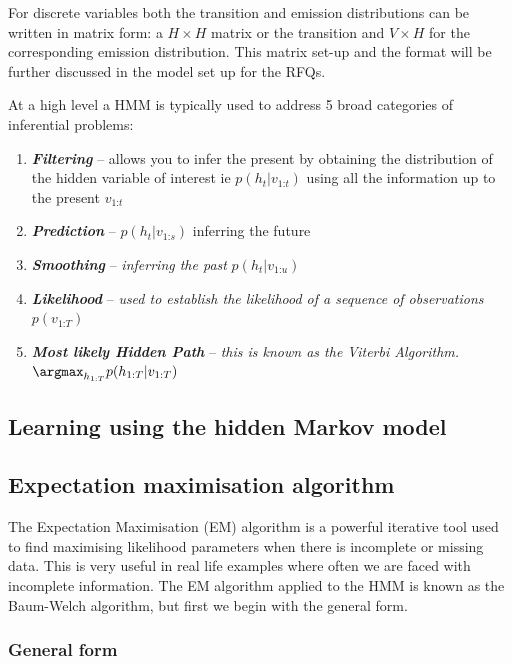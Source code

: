 For discrete variables both the transition and emission distributions can be written in matrix form: a $H\times H$ matrix or the transition and $V\times H$ for the corresponding emission distribution. This matrix set-up and the format will be further discussed in the model set up for the RFQs.

At a high level a HMM is typically used to address 5 broad categories of inferential problems:

\begin{enumerate}
    \item \textbf{\textit{Filtering}} -- allows you to infer the present by obtaining the distribution of the hidden variable of interest ie $p{(h_t | v_{1\text{:}t})}$ using all the information up to the present $v_{1\text{:}t}$
    \item \textbf{\textit{Prediction}} -- $p{(h_t | v_{1\text{:}s})}$ inferring the future
    \item \textbf{\textit{Smoothing}} -- \textit{inferring the past} $p{(h_t | v_{1\text{:}u})}$
    \item \textbf{\textit{Likelihood}} -- \textit{used to establish the likelihood of a sequence of observations} $p{(v_{1\text{:}T})}$
    \item \textbf{\textit{Most likely Hidden Path}} -- \textit{this is known as the Viterbi Algorithm.}\\ $\argmax_{h_{1\text{:}T}} p{(h_{1\text{:}T} | v_{1\text{:}T})}$
\end{enumerate}


\subsection{Learning using the hidden Markov model}
\subsection{Expectation maximisation algorithm}

The Expectation Maximisation (EM) algorithm is a powerful iterative tool used to find maximising likelihood parameters when there is incomplete or missing data. This is very useful in real life examples where often we are faced with incomplete information. The EM algorithm applied to the HMM is known as the Baum-Welch \autocite{baum1970maximization} algorithm, but first we begin with the general form.

\subsubsection{General form}

